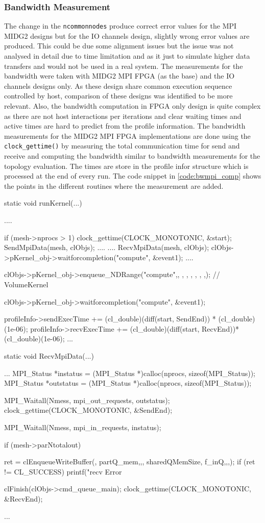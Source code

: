 \subsubsection{Bandwidth Measurement}
The change in the \texttt{ncommonnodes} produce correct error values for the MPI MIDG2 designs but
for the IO channels design, slightly wrong error values are produced. This could be due some alignment
issues but the issue was not analysed in detail due to time limitation and as it just to simulate
higher data transfers and would not be used in a real system. The measurements for the bandwidth
were taken with MIDG2 MPI FPGA (as the base) and the IO channels designs only. As these
design share common execution sequence controlled by host, comparison of these designs
was identified to be more relevant. Also, the bandwidth computation in FPGA only design
is quite complex as there are not host interactions per iterations and clear waiting times
and active times are hard to predict from the profile information.
The bandwidth measurements for the MIDG2 MPI FPGA implementations are done using the \texttt{clock\_gettime()}
by measuring the total communication time for send and receive and computing the bandwidth similar to
bandwidth measurements for the topology evaluation. The times are store in the profile infor structure
which is processed at the end of every run. The code snippet in \ref{code:bwmpi_comp} shows the points in the different
routines where the measurement are added.
\begin{CppCode}[caption=Send and receive communication time computation changes for MIDG2 MPI FPGA, frame=tlrb, label=code:bwmpi_comp]
static void runKernel(...)
{
    ....

    if (mesh->nprocs > 1)
    {
    clock_gettime(CLOCK_MONOTONIC, &start);
    SendMpiData(mesh, clObjs);
    ....
    ....
    RecvMpiData(mesh, clObjs);
    clObjs->pKernel_obj->waitforcompletion("compute", &event1);
    ....
    }

    clObjs->pKernel_obj->enqueue_NDRange("compute",, , , , , , ,); // VolumeKernel

    clObjs->pKernel_obj->waitforcompletion("compute", &event1);

    profileInfo->sendExecTime += (cl_double)(diff(start, SendEnd)) * (cl_double)(1e-06);
    profileInfo->recvExecTime += (cl_double)(diff(start, RecvEnd))* (cl_double)(1e-06);
    ...
}

static void RecvMpiData(...)
{
 ...
    MPI_Status *instatus = (MPI_Status *)calloc(nprocs, sizeof(MPI_Status));
    MPI_Status *outstatus = (MPI_Status *)calloc(nprocs, sizeof(MPI_Status));

    MPI_Waitall(Nmess, mpi_out_requests, outstatus);
    clock_gettime(CLOCK_MONOTONIC, &SendEnd);

    MPI_Waitall(Nmess, mpi_in_requests, instatus);

    if (mesh->parNtotalout)
    {
        ret = clEnqueueWriteBuffer(, partQ_mem,,, sharedQMemSize, f_inQ,,,);
        if (ret != CL_SUCCESS)
            printf("recv Error %

        clFinish(clObjs->cmd_queue_main);
        clock_gettime(CLOCK_MONOTONIC, &RecvEnd);
    }
...
}
\end{CppCode}

